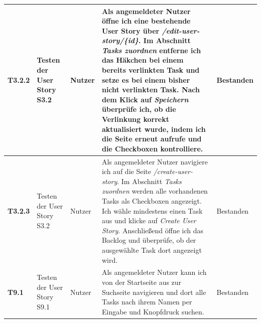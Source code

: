 \documentclass[a4paper,11pt]{article}
\begin{document}
\begin{longtable}{|p{3.3cm}|p{3.3cm}|p{3.3cm}|p{5.5cm}|p{3.3cm}|}
	\textbf{T3.2.2} &                                                                                                                                                                                    
	Testen der User Story S3.2 &                                                                                                                                                                    
	Nutzer &                                                                                                                                                                                             
	Als angemeldeter Nutzer öffne ich eine bestehende User Story über \textit{/edit-user-story/\{id\}}. Im Abschnitt \textit{Tasks zuordnen} entferne ich das Häkchen bei einem bereits verlinkten Task und setze es bei einem bisher nicht verlinkten Task. Nach dem Klick auf \textit{Speichern} überprüfe ich, ob die Verlinkung korrekt aktualisiert wurde, indem ich die Seite erneut aufrufe und die Checkboxen kontrolliere. &                                                                                                  
	Bestanden
	\\
	\hline

	\textbf{T3.2.3} &                                                                                                                                                                                    
	Testen der User Story S3.2 &                                                                                                                                                                    
	Nutzer &                                                                                                                                                                                             
	Als angemeldeter Nutzer navigiere ich auf die Seite \textit{/create-user-story}. Im Abschnitt \textit{Tasks zuordnen} werden alle vorhandenen Tasks als Checkboxen angezeigt. Ich wähle mindestens einen Task aus und klicke auf \textit{Create User Story}. Anschließend öffne ich das Backlog und überprüfe, ob der ausgewählte Task dort angezeigt wird. &                                                                                                  
	Bestanden
	\\
	\hline
    
    \textbf{T9.1} &                                                                                                                                                                                    
	Testen der User Story S9.1 &                                                                                                                                                                    
	Nutzer &                                                                                                                                                                                             
	Als  angemeldeter Nutzer kann ich von der Startseite aus zur Suchseite navigieren und dort alle Tasks nach ihrem Namen per Eingabe und Knopfdruck suchen.&                                                                                                  
	Bestanden
	\\
	\hline


\end{longtable}
\end{document}
